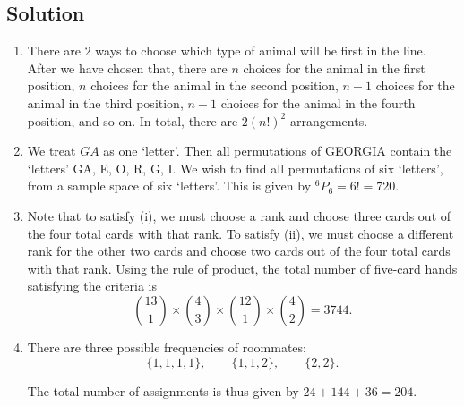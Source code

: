 \documentclass{article}
\begin{document}
\subsection*{Solution}
    \begin{enumerate}
        \item There are $2$ ways to choose which type of animal will be first in the line. After we have chosen that, there are $n$ choices for the animal in the first position, $n$ choices for the animal in the second position, $n - 1$ choices for the animal in the third position, $n - 1$ choices for the animal in the fourth position, and so on. In total, there are $2(n!)^{2}$ arrangements.
        \item We treat $GA$ as one `letter'. Then all permutations of GEORGIA contain the `letters' GA, E, O, R, G, I. We wish to find all permutations of six `letters', from a sample space of six `letters'. This is given by ${}^6P_{6} = 6! = 720$.
        \item Note that to satisfy (i), we must choose a rank and choose three cards out of the four total cards with that rank. To satisfy (ii), we must choose a different rank for the other two cards and choose two cards out of the four total cards with that rank. Using the rule of product, the total number of five-card hands satisfying the criteria is $$\binom{13}{1} \times \binom{4}{3} \times \binom{12}{1} \times \binom{4}{2} = 3744.$$
        \item 
        There are three possible frequencies of roommates:
        $$\{1, 1, 1, 1\}, \qquad \{1, 1, 2\}, \qquad \{2, 2\}.$$
        The total number of assignments is thus given by $24 + 144 + 36 = 204.$
    \end{enumerate}
\end{document}
